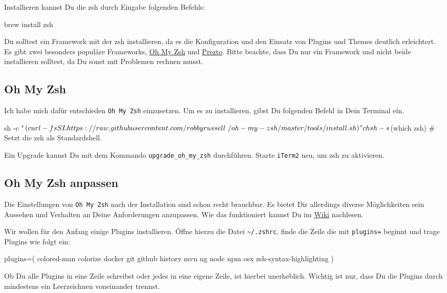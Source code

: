 \documentclass[]{article}
\newcommand{\code}[1]{\texttt{#1}}
\begin{document}
Installieren kannst Du die zsh durch Eingabe folgenden Befehls:
\begin{bashcode}
brew install zsh
\end{bashcode}

Du solltest ein Framework mit der zsh installieren, da es die Konfiguration und den Einsatz von Plugins und Themes deutlich erleichtert. Es gibt zwei besonders populäre Frameworks, \href{https://github.com/robbyrussell/oh-my-zsh}{Oh My Zsh} und \href{https://github.com/sorin-ionescu/prezto}{Prezto}.
Bitte beachte, dass Du nur ein Framework und nicht beide installieren solltest, da Du sonst mit Problemen rechnen musst.

\subsection{Oh My Zsh}
Ich habe mich dafür entschieden \code{Oh My Zsh} einzusetzen. Um es zu installieren, gibst Du folgenden Befehl in Dein Terminal ein.
\begin{bashcode}
sh -c "$(curl -fsSL https://raw.githubusercontent.com/robbyrussell\
/oh-my-zsh/master/tools/install.sh)"
chsh -s $(which zsh) # Setzt die zsh als Standardshell.
\end{bashcode}

Ein Upgrade kannst Du mit dem Kommando \code{upgrade\_oh\_my\_zsh} durchführen. Starte \code{iTerm2} neu, um zsh zu aktivieren.

\subsection{Oh My Zsh anpassen}
Die Einstellungen von \code{Oh My Zsh} nach der Installation sind schon recht brauchbar. Es bietet Dir allerdings diverse Möglichkeiten sein Aussehen und Verhalten an Deine Anforderungen anzupassen. Wie das funktioniert kannst Du im \href{https://github.com/robbyrussell/oh-my-zsh/wiki}{Wiki} nachlesen.

Wir wollen für den Anfang einige Plugins installieren. Öffne hierzu die Datei \code{\~\//.zshrc}, finde die Zeile die mit \code{plugins=} beginnt und trage Plugins wie folgt ein:
\begin{bashcode}
plugins=(
  colored-man 
  colorize  
  docker 
  git 
  github 
  history 
  mvn 
  ng 
  node 
  npm 
  osx 
  zsh-syntax-highlighting
)
\end{bashcode}
Ob Du alle Plugins in eine Zeile schreibst oder jedes in eine eigene Zeile, ist hierbei unerheblich. Wichtig ist nur, dass Du die Plugins durch mindestens ein Leerzeichnen voneinander trennst.
\end{document}
